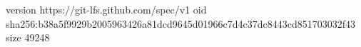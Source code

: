 version https://git-lfs.github.com/spec/v1
oid sha256:b38a5f9929b2005963426a81dcd9645d01966c7d4c37dc8443cd851703032f43
size 49248
